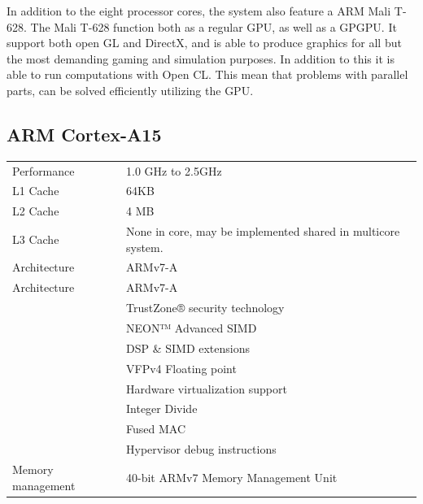 In addition to the eight processor cores, the system also feature a ARM Mali T-628.
The Mali T-628 function both as a regular GPU, as well as a GPGPU.
It support both open GL and DirectX, and is able to produce graphics for all but the most demanding gaming and simulation purposes.
In addition to this it is able to run computations with Open CL.
This mean that problems with parallel parts, can be solved efficiently utilizing the GPU.

\subsection{ARM Cortex-A15}
\begin{table}[H]
  \begin{tabular}{ll}
    Performance       & 1.0 GHz to 2.5GHz  \\
    L1 Cache          & 64KB \\
    L2 Cache          & 4 MB \\
    L3 Cache          & None in core, may be implemented shared in multicore system. \\Architecture      & ARMv7-A            \\
    Architecture      & ARMv7-A            \\
                      & TrustZone® security technology \\
                      & NEON™ Advanced SIMD \\
                      & DSP \& SIMD extensions \\
                      & VFPv4 Floating point \\
                      & Hardware virtualization support \\
                      & Integer Divide \\
                      & Fused MAC \\
                      & Hypervisor debug instructions \\
    Memory management & 40-bit ARMv7 Memory Management Unit
  \end{tabular}
\end{table}
